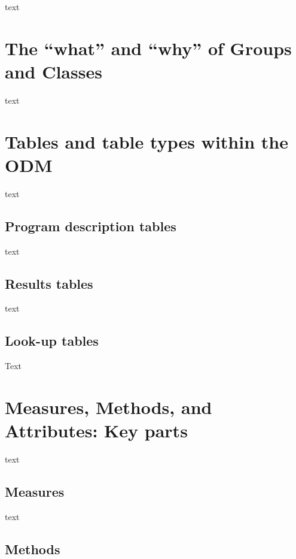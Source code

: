\documentclass[
  letterpaper,
  DIV=11,
  numbers=noendperiod]{scrartcl}
\begin{document}
text

\hypertarget{the-what-and-why-of-groups-and-classes}{%
\section{The ``what'' and ``why'' of Groups and
Classes}\label{the-what-and-why-of-groups-and-classes}}

text

\hypertarget{tables-and-table-types-within-the-odm}{%
\section{Tables and table types within the
ODM}\label{tables-and-table-types-within-the-odm}}

text

\hypertarget{program-description-tables}{%
\subsection{Program description
tables}\label{program-description-tables}}

text

\hypertarget{results-tables}{%
\subsection{Results tables}\label{results-tables}}

text

\hypertarget{look-up-tables}{%
\subsection{Look-up tables}\label{look-up-tables}}

Text

\hypertarget{measures-methods-and-attributes-key-parts}{%
\section{Measures, Methods, and Attributes: Key
parts}\label{measures-methods-and-attributes-key-parts}}

text

\hypertarget{measures}{%
\subsection{Measures}\label{measures}}

text

\hypertarget{methods}{%
\subsection{Methods}\label{methods}}
\end{document}
